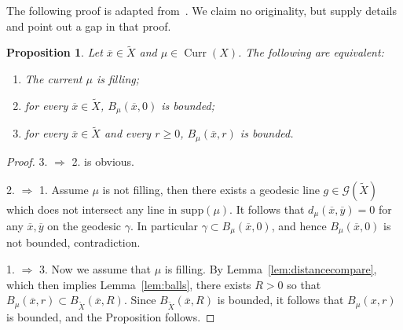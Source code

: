 \documentclass[12pt,article]{amsart}
\numberwithin{equation}{section}
\numberwithin{figure}{section}
\newtheorem{proposition}[equation]{Proposition}
\theoremstyle{definition}
\theoremstyle{plain}
\DeclareMathOperator{\Curr}{Curr}
\newcommand*{\wt}[1]{\widetilde{#1}}
\begin{document}
The following proof is adapted from~\cite[Proposition~2.8]{Glo17:CriticalExponents}. We claim no originality, but supply details and point out a gap in that proof.
\begin{proposition}
Let $\overline{x} \in \wt{X}$ and $\mu \in \Curr (X)$.
The following are equivalent:
\begin{enumerate}
    \item The current $\mu$ is filling;
    \item for every $\overline{x} \in \wt{X}$, $B_{\mu} (\overline{x}, 0)$ is bounded;
    \item for every $\overline{x} \in \wt{X}$ and every $r \geq 0$, $B_{\mu} (\overline{x}, r)$ is bounded.
\end{enumerate}
\label{prop:bounded}
\end{proposition}

\begin{proof}
3. $\Rightarrow$ 2. is obvious.

2. $\Rightarrow$ 1. Assume $\mu$ is not filling, then there exists a geodesic line $g \in \mathcal{G}(\wt{X})$ which does not intersect any line in $\mathrm{supp}(\mu)$. It follows that $
d_{\mu} (\overline{x},\overline{y}) = 0$ for any $\overline{x},\overline{y}$ on the geodesic $\gamma$.
In particular $\gamma \subset B_{\mu}(\overline{x},0)$, and hence $B_{\mu}(\overline{x},0)$ is not bounded, contradiction.

1. $\Rightarrow$ 3. Now we assume that $\mu$ is filling.
By Lemma~\ref{lem:distancecompare}, which then implies Lemma~\ref{lem:balls}, there exists $R>0$ so that $B_\mu (\overline{x}, r) \subset B_{\wt{X}}(\overline{x},R)$. Since  $B_{\wt{X}}(\overline{x},R)$ is bounded, it follows that $B_\mu (x,r)$ is bounded, and the Proposition follows. 
\end{proof}
\end{document}

